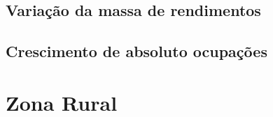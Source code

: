 \documentclass[8pt]{beamer}
\begin{document}
\subsection{Variação da massa de rendimentos}

\begin{frame}
\textit{\hyperlink{indice_principal_amz_jovem}{}}

\end{frame}

\begin{frame}
\textit{\hyperlink{indice_principal_amz_jovem}{}}

\end{frame}

\subsection{Crescimento de absoluto ocupações}

\begin{frame}
\textit{\hyperlink{indice_principal_amz_jovem}{}}

\end{frame}

\begin{frame}
\textit{\hyperlink{indice_principal_amz_jovem}{}}

\end{frame}


\section{Zona Rural}
\end{document}
